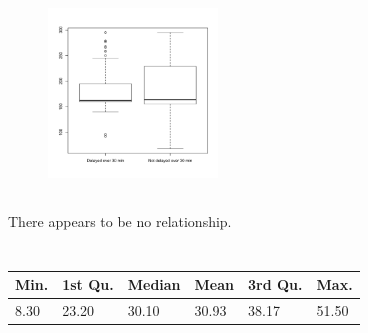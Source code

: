 \documentclass[twocolumn]{article}
\newcommand{\setsection}[1]{\setcounter{section}{#1}\section{}}
\begin{document}
\subsection{}
\begin{figure}[h]
\centering
\includegraphics[width=0.4\textwidth]{4c.pdf}
\end{figure}

\subsection{}
There appears to be no relationship.

\setsection{6}

\subsection{}
\begin{table}[h]
\centering
\begin{tabular}{@{}llllll@{}}
\toprule
Min. & 1st Qu. & Median & Mean  & 3rd Qu. & Max.  \\ \midrule
8.30 & 23.20   & 30.10  & 30.93 & 38.17   & 51.50  \\ \bottomrule
\end{tabular}
\end{table}
\end{document}
